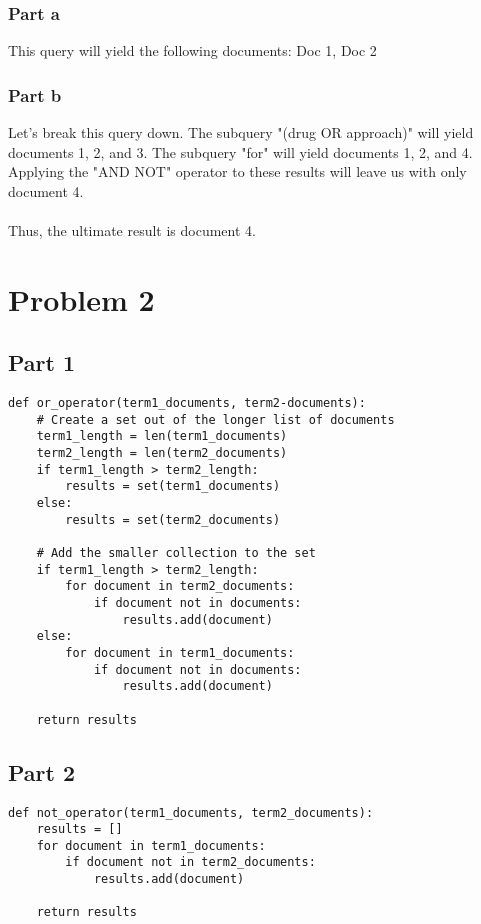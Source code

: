 \documentclass{article}%
\begin{document}
\subsubsection*{Part a}

This query will yield the following documents: Doc 1, Doc 2

\subsubsection*{Part b}

Let's break this query down. The subquery "(drug OR approach)" will yield documents 1, 2, and 3. The subquery "for" will yield documents 1, 2, and 4. Applying the "AND NOT" operator to these results will leave us with only document 4.\\
\\
Thus, the ultimate result is document 4.

\section*{Problem 2}
\subsection*{Part 1}

\lstset{language=Python}
\begin{lstlisting}[frame=single]
def or_operator(term1_documents, term2-documents):
    # Create a set out of the longer list of documents
    term1_length = len(term1_documents)
    term2_length = len(term2_documents)
    if term1_length > term2_length:
        results = set(term1_documents)
    else:
        results = set(term2_documents)

    # Add the smaller collection to the set
    if term1_length > term2_length:
        for document in term2_documents:
            if document not in documents:
                results.add(document)
    else:
        for document in term1_documents:
            if document not in documents:
                results.add(document)

    return results
\end{lstlisting}

\subsection*{Part 2}
\begin{lstlisting}[frame=single]
def not_operator(term1_documents, term2_documents):
    results = []
    for document in term1_documents:
        if document not in term2_documents:
            results.add(document)

    return results
\end{lstlisting}
\end{document}
